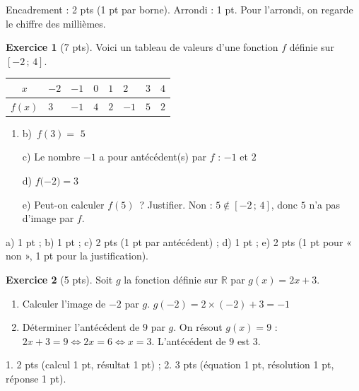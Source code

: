 \documentclass[12pt]{exam}
\theoremstyle{definition}
\newtheorem{exercice}{Exercice}
\begin{document}
\textcolor{sol}{\small Encadrement : 2 pts (1 pt par borne). Arrondi : 1 pt. Pour l'arrondi, on regarde le chiffre des millièmes.}
\vfill
\begin{exercice}[7 pts]
Voici un tableau de valeurs d'une fonction $f$ définie sur $[-2\,;\,4]$.
\begin{center}
\renewcommand{\arraystretch}{1.6}
\begin{tabular}{|c|*{7}{C{1.2cm}|}}
\hline
$x$ & $-2$ & $-1$ & $0$ & $1$ & $2$ & $3$ & $4$ \\ \hline
$f(x)$ & $3$ & $-1$ & $4$ & $2$ & $-1$ & $5$ & $2$ \\ \hline
\end{tabular}
\end{center}
\begin{enumerate}[label=\alph*), itemsep=1.2em, topsep=0.6em]
\item {}b)~$f(3) = $ \textcolor{sol}{$5$}
\item[c)] Le nombre $-1$ a pour antécédent(s) par $f$ : \textcolor{sol}{$-1$ et $2$}
\item[d)] $f($\textcolor{sol}{$-2$}$) = 3$
\item[e)] Peut-on calculer $f(5)$~? Justifier. \textcolor{sol}{Non : $5\notin[-2\,;\,4]$, donc $5$ n'a pas d'image par $f$.}
\end{enumerate}
\textcolor{sol}{\small a) 1 pt ; b) 1 pt ; c) 2 pts (1 pt par antécédent) ; d) 1 pt ; e) 2 pts (1 pt pour « non », 1 pt pour la justification).}
\end{exercice}

\vfill
\begin{exercice}[5 pts]
Soit $g$ la fonction définie sur $\mathbb{R}$ par $g(x) = 2x+3$.
\begin{enumerate}[label=\arabic*., itemsep=1.2em, topsep=0.6em]
\item Calculer l'image de $-2$ par $g$. \hfill \textcolor{sol}{$g(-2)=2\times(-2)+3=-1$} \hspace*{1cm}
\item Déterminer l'antécédent de $9$ par $g$. \textcolor{sol}{On résout $g(x)=9$ : $2x+3=9 \iff 2x=6 \iff x=3$. L'antécédent de $9$ est $3$.}
\end{enumerate}
\textcolor{sol}{\small 1. 2 pts (calcul 1 pt, résultat 1 pt) ; 2. 3 pts (équation 1 pt, résolution 1 pt, réponse 1 pt).}
\end{exercice}
\end{document}

